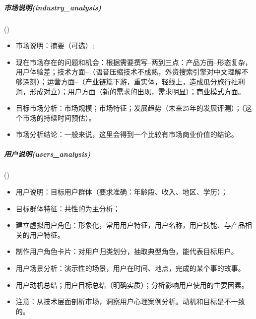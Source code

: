 \documentclass[letterpaper,10pt,english]{sphinxmanual}
\begin{document}
\subparagraph{市场说明(industry\_analysis)}
\label{\detokenize{chapter_knowledge/MRD:industry-analysis}}
{\hyperref[\detokenize{chapter_knowledge/industry_analysis:industry-analysis}]{}} ()
\begin{itemize}
\item {} 
市场说明：摘要（可选）;

\item {} 
现在市场存在的问题和机会：根据需要撰写–两到三点：产品方面–形态复杂，用户体验差；技术方面–（语音压缩技术不成熟，外资搜索引擎对中文理解不够深刻）；运营方面–（产业链篇下游，重实体，轻线上，造成瓜分旅行社利润，形成对立）；用户方面（新的需求的出现，需求明显）；商业模式方面。

\item {} 
目标市场分析：市场规模；市场特征；发展趋势（未来2\sphinxhyphen{}5年的发展评测）；（这个市场的持续时间预估）。

\item {} 
市场分析结论：一般来说，这里会得到一个比较有市场商业价值的结论。

\end{itemize}


\subparagraph{用户说明(users\_analysis)}
\label{\detokenize{chapter_knowledge/MRD:users-analysis}}
{\hyperref[\detokenize{chapter_knowledge/users_analysis:users-analysis}]{}} ()
\begin{itemize}
\item {} 
用户说明：目标用户群体（要求准确：年龄段、收入、地区、学历）；

\item {} 
目标群体特征：共性的为主分析；

\item {} 
建立虚拟用户角色：形象化，常用用户特征，用户名称，用户技能、与产品相关的用户特征。

\item {} 
制作用户角色卡片：对用户归类划分，抽取典型角色，能代表目标用户。

\item {} 
用户场景分析：演示性的场景，用户在时间、地点，完成的某个事的故事。

\item {} 
用户动机总结；用户目标总结（明确实质）；分析影响用户使用的主要因素。

\item {} 
注意：从技术层面剖析市场，洞察用户心理案例分析。动机和目标是不一致的。

\end{itemize}
\end{document}
